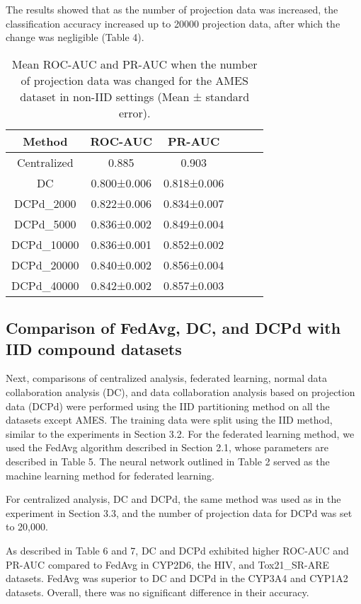 \documentclass{article}
\begin{document}
The results showed that as the number of projection data was increased, the classification accuracy increased up to 20000 projection data, after which the change was negligible (Table 4).

\begin{table}[htbp]
\centering
\caption{Mean ROC-AUC and PR-AUC when the number of projection data was changed for the AMES dataset in non-IID settings (Mean ± standard error).}
  \label{tab:Table 2}
  \begin{tabular}{cccccc}
    \hline
Method & ROC-AUC & PR-AUC \\ 
    \hline
Centralized & 0.885 & 0.903 \\ 
DC & 0.800±0.006 & 0.818±0.006 \\ 
DCPd\_2000 & 0.822±0.006 & 0.834±0.007 \\ 
DCPd\_5000 & 0.836±0.002 & 0.849±0.004 \\ 
DCPd\_10000 & 0.836±0.001 & 0.852±0.002 \\ 
DCPd\_20000 & 0.840±0.002 & 0.856±0.004 \\ 
DCPd\_40000 & 0.842±0.002 & 0.857±0.003 \\ 
    \hline
\end{tabular}
\end{table}

\subsection{Comparison of FedAvg, DC, and DCPd with IID compound datasets}
\label{sec:sample1}
Next, comparisons of centralized analysis, federated learning, normal data collaboration analysis (DC), and data collaboration analysis based on projection data (DCPd) were performed using the IID partitioning method on all the datasets except AMES. The training data were split using the IID method, similar to the experiments in Section 3.2. For the federated learning method, we used the FedAvg algorithm described in Section 2.1, whose parameters are described in Table 5. The neural network outlined in Table 2 served as the machine learning method for federated learning.

For centralized analysis, DC and DCPd, the same method was used as in the experiment in Section 3.3, and the number of projection data for DCPd was set to 20,000.

As described in Table 6 and 7, DC and DCPd exhibited higher ROC-AUC and PR-AUC compared to FedAvg in CYP2D6, the HIV, and Tox21\_SR-ARE datasets. FedAvg was superior to DC and DCPd in the CYP3A4 and CYP1A2 datasets. Overall, there was no significant difference in their accuracy.
\end{document}
